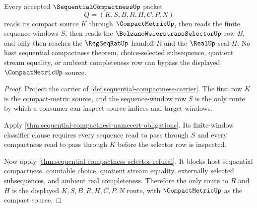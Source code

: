 \begin{theorem}
\label{thm:sequential-compactness-compactmetric-route}
Every accepted $\SequentialCompactnessUp$ packet
$$
Q=(K,S,B,R,H,C,P,N)
$$
reads its compact source $K$ through $\CompactMetricUp$, then reads the finite sequence windows $S$, then reads the $\BolzanoWeierstrassSelectorUp$ row $B$, and only then reaches the $\RegSeqRatUp$ handoff $R$ and the $\RealUp$ seal $H$. No host sequential compactness theorem, choice-selected subsequence, quotient stream equality, or ambient completeness row can bypass the displayed $\CompactMetricUp$ source.
\end{theorem}
\begin{proof}
Project the carrier of \autoref{def:sequential-compactness-carrier}. The first row $K$ is the compact-metric source, and the sequence-window row $S$ is the only route by which a consumer can inspect source indices and target windows.

Apply \autoref{thm:sequential-compactness-namecert-obligations}. Its finite-window classifier clause requires every sequence read to pass through $S$ and every compactness read to pass through $K$ before the selector row is inspected.

Now apply \autoref{thm:sequential-compactness-selector-refusal}. It blocks host sequential compactness, countable choice, quotient stream equality, externally selected subsequences, and ambient real completeness. Therefore the only route to $R$ and $H$ is the displayed $K,S,B,R,H,C,P,N$ route, with $\CompactMetricUp$ as the compact source.
\end{proof}

